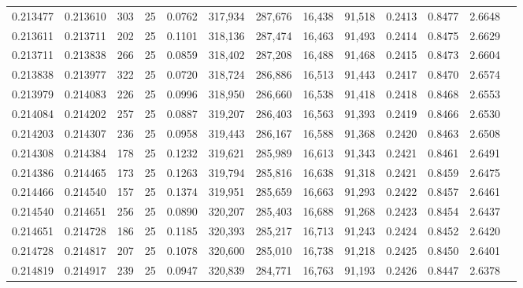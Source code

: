 \begin{tabular}{rrrrrrrrrrrrr}
0.213477 & 0.213610 &   303 &  25 &                                     0.0762 & 317,934 & 287,676 &  16,438 &  91,518 & 0.2413 & 0.8477 & 2.6648 \\
0.213611 & 0.213711 &   202 &  25 &                                     0.1101 & 318,136 & 287,474 &  16,463 &  91,493 & 0.2414 & 0.8475 & 2.6629 \\
0.213711 & 0.213838 &   266 &  25 &                                     0.0859 & 318,402 & 287,208 &  16,488 &  91,468 & 0.2415 & 0.8473 & 2.6604 \\
0.213838 & 0.213977 &   322 &  25 &                                     0.0720 & 318,724 & 286,886 &  16,513 &  91,443 & 0.2417 & 0.8470 & 2.6574 \\
0.213979 & 0.214083 &   226 &  25 &                                     0.0996 & 318,950 & 286,660 &  16,538 &  91,418 & 0.2418 & 0.8468 & 2.6553 \\
0.214084 & 0.214202 &   257 &  25 &                                     0.0887 & 319,207 & 286,403 &  16,563 &  91,393 & 0.2419 & 0.8466 & 2.6530 \\
0.214203 & 0.214307 &   236 &  25 &                                     0.0958 & 319,443 & 286,167 &  16,588 &  91,368 & 0.2420 & 0.8463 & 2.6508 \\
0.214308 & 0.214384 &   178 &  25 &                                     0.1232 & 319,621 & 285,989 &  16,613 &  91,343 & 0.2421 & 0.8461 & 2.6491 \\
0.214386 & 0.214465 &   173 &  25 &                                     0.1263 & 319,794 & 285,816 &  16,638 &  91,318 & 0.2421 & 0.8459 & 2.6475 \\
0.214466 & 0.214540 &   157 &  25 &                                     0.1374 & 319,951 & 285,659 &  16,663 &  91,293 & 0.2422 & 0.8457 & 2.6461 \\
0.214540 & 0.214651 &   256 &  25 &                                     0.0890 & 320,207 & 285,403 &  16,688 &  91,268 & 0.2423 & 0.8454 & 2.6437 \\
0.214651 & 0.214728 &   186 &  25 &                                     0.1185 & 320,393 & 285,217 &  16,713 &  91,243 & 0.2424 & 0.8452 & 2.6420 \\
0.214728 & 0.214817 &   207 &  25 &                                     0.1078 & 320,600 & 285,010 &  16,738 &  91,218 & 0.2425 & 0.8450 & 2.6401 \\
0.214819 & 0.214917 &   239 &  25 &                                     0.0947 & 320,839 & 284,771 &  16,763 &  91,193 & 0.2426 & 0.8447 & 2.6378 \\

\end{tabular}

